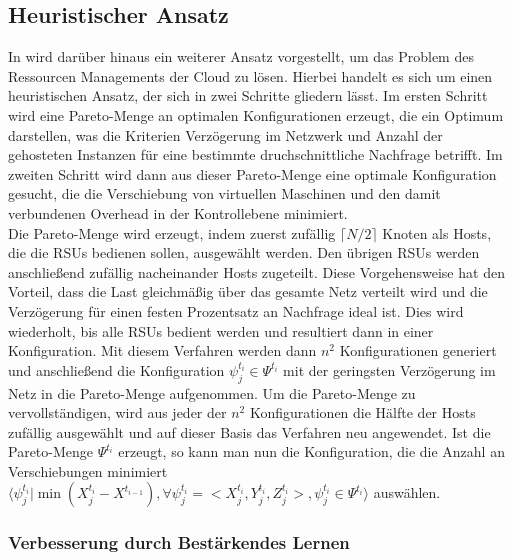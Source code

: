 \documentclass[conference]{IEEEtran}
\begin{document}
\subsection{Heuristischer Ansatz}
In \cite{IEEEhowto:orig} wird darüber hinaus ein weiterer Ansatz vorgestellt, um das Problem des Ressourcen Managements der Cloud zu lösen. Hierbei handelt es sich um einen heuristischen Ansatz, der sich in zwei Schritte gliedern lässt. Im ersten Schritt wird eine Pareto-Menge an optimalen Konfigurationen erzeugt, die ein Optimum darstellen, was die Kriterien Verzögerung im Netzwerk und Anzahl der gehosteten Instanzen für eine bestimmte druchschnittliche Nachfrage betrifft. Im zweiten Schritt wird dann aus dieser Pareto-Menge eine optimale Konfiguration gesucht, die die Verschiebung von virtuellen Maschinen und den damit verbundenen Overhead in der Kontrollebene minimiert. \\
Die Pareto-Menge wird erzeugt, indem zuerst zufällig \(\lceil N/2 \rceil\) Knoten als Hosts, die die RSUs bedienen sollen, ausgewählt werden. Den übrigen RSUs werden anschließend zufällig nacheinander Hosts zugeteilt. Diese Vorgehensweise hat den Vorteil, dass die Last gleichmäßig über das gesamte Netz verteilt wird und die Verzögerung für einen festen Prozentsatz an Nachfrage ideal ist.
Dies wird wiederholt, bis alle RSUs bedient werden und resultiert dann in einer Konfiguration.
Mit diesem Verfahren werden dann \(n^2\) Konfigurationen generiert und anschließend die Konfiguration \(\psi_j^{t_i} \in \Psi^{t_i}\) mit der geringsten Verzögerung im Netz in die Pareto-Menge aufgenommen.
Um die Pareto-Menge zu vervollständigen, wird aus jeder der \(n^2\) Konfigurationen  die Hälfte der Hosts zufällig ausgewählt und auf dieser Basis das Verfahren neu angewendet. 
Ist die Pareto-Menge \(\Psi^{t_i}\) erzeugt, so kann man nun die Konfiguration, die die Anzahl an Verschiebungen minimiert \(\langle \psi_{j}^{t_i}|\min(X_{j}^{t_i}-X^{t_{i-1}}),\forall \psi_{j}^{t_i}=<X_{j}^{t_i},Y_{j}^{t_i},Z_{j}^{t_i}>, \psi_{j}^{t_i} \in \Psi^{t_i}  \rangle\) auswählen.


\subsubsection{Verbesserung durch Bestärkendes Lernen}
\end{document}
